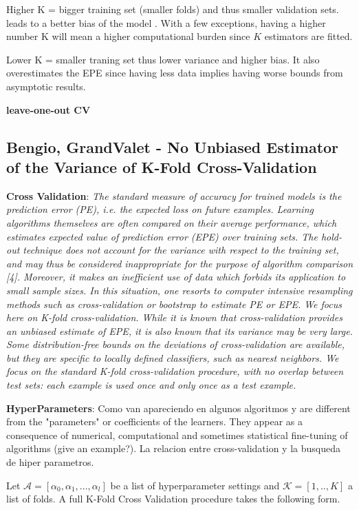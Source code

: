 \documentclass{article}%
\theoremstyle{definition}
\begin{document}
 Higher K = bigger training set (smaller folds) and thus smaller validation sets. leads to a better bias of the model . With a few exceptions, having a higher number K will mean a higher computational burden since $K$ estimators are fitted. 
 
 Lower K = smaller traning set thus lower variance and higher bias. It also overestimates the EPE since having less data implies having worse bounds from asymptotic results. 
 
 \textbf{leave-one-out CV}
 
 
 \subsection{Bengio, GrandValet - No Unbiased Estimator of the Variance of K-Fold Cross-Validation}
 \textbf{Cross Validation}: 
 \textit{The standard measure of accuracy for trained models is the prediction error (PE), i.e. the expected loss on future examples. Learning algorithms themselves are often compared on their average performance, which estimates expected value of prediction error (EPE) over training sets.
 	The hold-out technique does not account for the variance with respect to the training set, and may thus be considered inappropriate for the purpose of algorithm comparison [4]. Moreover, it makes an inefficient use of data which forbids its application to small sample sizes. In this situation, one resorts to computer intensive resampling methods such as cross-validation or bootstrap to estimate PE or EPE. We focus here on K-fold cross-validation. While it is known that cross-validation provides an unbiased estimate of EPE, it is also known that its variance may be very large.
 	Some distribution-free bounds on the deviations of cross-validation are available, but they are specific to locally defined classifiers, such as nearest neighbors.
 	We focus on the standard K-fold cross-validation procedure, with no overlap between test sets: each example is used once and only once as a test example.
 }
 
 
 \textbf{HyperParameters}:
 Como van apareciendo en algunos algoritmos y are different from the "parameters" or coefficients of the learners. They appear as a consequence of numerical, computational and sometimes statistical fine-tuning of algorithms (give an example?). 
 La relacion entre cross-validation y la busqueda de hiper parametros. 
 
 \textit{}
 
 \textit{} 
 
 Let $\mathcal{A} = [\alpha_0, \alpha_1,..., \alpha_l   ]$ be a list of hyperparameter settings and  $\mathcal{K} =[1,..,K]$ a list of folds.  A full K-Fold Cross Validation procedure takes the following form.
 
\end{document}
